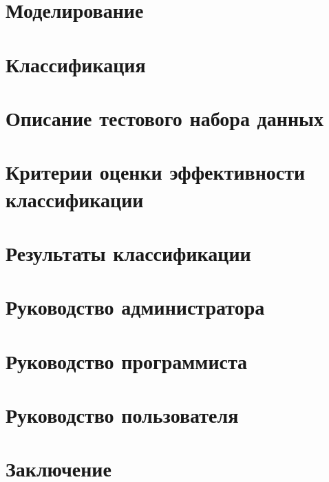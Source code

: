 \newpage  
\section{Моделирование}

 
 
\newpage  
\section{Классификация}\label{classifiers}



\newpage 
\section{Описание тестового набора данных}\label{test_data}


\section{Критерии оценки эффективности классификации}\label{eval}


\newpage 
\section{Результаты классификации}


\newpage  
\section{Руководство администратора}


\newpage  
\section{Руководство программиста}


\newpage  
\section{Руководство пользователя}

 
 \newpage
\section*{Заключение}

 
 
 \newpage
 \renewcommand{\refname}{Список использованных источников}
 

